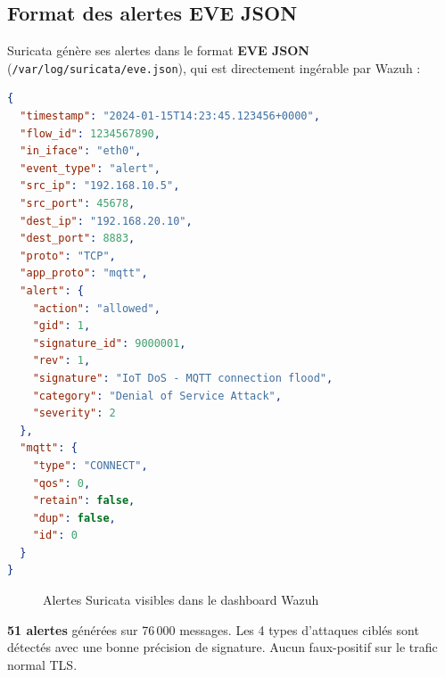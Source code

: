 \subsection{Format des alertes EVE JSON}

Suricata génère ses alertes dans le format \textbf{EVE JSON} (\texttt{/var/log/suricata/eve.json}), qui est directement ingérable par Wazuh :

\begin{lstlisting}[language=json, caption=Exemple d'alerte Suricata EVE JSON]
{
  "timestamp": "2024-01-15T14:23:45.123456+0000",
  "flow_id": 1234567890,
  "in_iface": "eth0",
  "event_type": "alert",
  "src_ip": "192.168.10.5",
  "src_port": 45678,
  "dest_ip": "192.168.20.10",
  "dest_port": 8883,
  "proto": "TCP",
  "app_proto": "mqtt",
  "alert": {
    "action": "allowed",
    "gid": 1,
    "signature_id": 9000001,
    "rev": 1,
    "signature": "IoT DoS - MQTT connection flood",
    "category": "Denial of Service Attack",
    "severity": 2
  },
  "mqtt": {
    "type": "CONNECT",
    "qos": 0,
    "retain": false,
    "dup": false,
    "id": 0
  }
}
\end{lstlisting}

\begin{figure}[H]
  \centering
  \caption{Alertes Suricata visibles dans le dashboard Wazuh}
  \label{fig:suricata_wazuh}
\end{figure}

\begin{tcolorbox}[colback=green!5, colframe=green!50!black, title=Résultats Suricata]
\textbf{51 alertes} générées sur 76\,000 messages. Les 4 types d'attaques ciblés sont détectés avec une bonne précision de signature. Aucun faux-positif sur le trafic normal TLS.
\end{tcolorbox}
